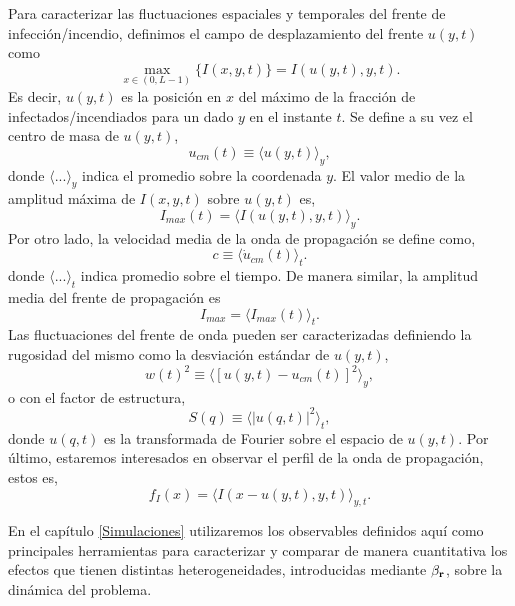 Para caracterizar las fluctuaciones espaciales y temporales del frente de infección/incendio, definimos el campo de desplazamiento del frente $u(y,t)$ como
\begin{equation}
  \max_{x\in(0,L-1)}\{I(x,y,t)\}=I(u(y,t),y,t).\label{campo}
\end{equation}
Es decir, $u(y,t)$ es la posición en $x$ del máximo de la fracción de infectados/incendiados para un dado $y$ en el instante $t$. Se define a su vez el centro de masa
de $u(y,t)$,
\begin{equation}
  u_{cm}(t)\equiv\langle u(y,t)\rangle_{y},\label{centromasa}
\end{equation}
donde $\langle...\rangle_{y}$ indica el promedio sobre la coordenada $y$. El valor medio de la amplitud máxima de $I(x,y,t)$ sobre $u(y,t)$ es,
\begin{equation}
  I_{max}(t)=\langle I(u(y,t),y,t)\rangle_{y}.\label{maximo}
\end{equation}
Por otro lado, la velocidad media de la onda de propagación se define como,
\begin{equation}
  c\equiv\langle\dot{u}_{cm}(t)\rangle_{t}.\label{velocidad}
\end{equation}
donde $\langle...\rangle_{t}$ indica promedio sobre el tiempo. De manera similar, la amplitud media del frente de propagación es
\begin{equation}
  I_{max}=\langle I_{max}(t)\rangle_{t}.  \label{Imax}
\end{equation} 
Las fluctuaciones del frente de onda pueden ser caracterizadas definiendo la rugosidad del mismo como la desviación estándar de $u(y,t)$,
\begin{equation}
  w(t)^2\equiv\langle[u(y,t)-u_{cm}(t)]^2\rangle_{y},\label{rugosidad}
\end{equation}  
o con el factor de estructura,
\begin{equation}
  S(q)\equiv\langle|u(q,t)|^2\rangle_{t},\label{factor}
\end{equation}
donde $u(q,t)$ es la transformada de Fourier sobre el espacio de $u(y,t)$.
Por último, estaremos interesados en observar el perfil de la onda de propagación, estos es,
\begin{equation}
  f_{I}(x)=\langle I(x-u(y,t),y,t)\rangle_{y,t}.\label{perfil}
\end{equation}

En el capítulo \ref{Simulaciones} utilizaremos los observables definidos aquí como principales herramientas para caracterizar y comparar de manera cuantitativa
los efectos que tienen distintas heterogeneidades, introducidas mediante $\beta_{\vb r}$, sobre la dinámica del problema. 

